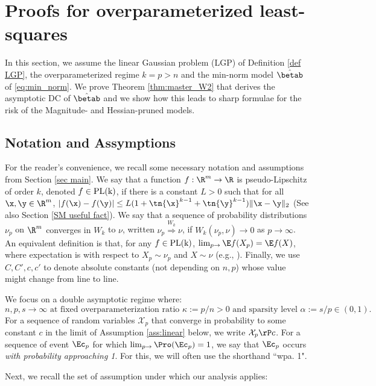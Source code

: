 
\section{Proofs for overparameterized least-squares}\label{sec proof thm 1}
In this section, we assume the linear Gaussian problem (LGP) of Definition \ref{def LGP}, the overparameterized regime $k=p>n$ and the min-norm model $\hat\betab$ of \eqref{eq:min_norm}. We prove Theorem \ref{thm:master_W2} that derives the asymptotic DC of $\hat\betab$ and we show how this leads to sharp formulae for the risk of the Magnitude- and Hessian-pruned models.


\subsection{Notation and Assymptions}
For the reader's convenience, we recall some necessary notation and assumptions from Section \ref{sec main}.  We say that a function $f:\R^m\rightarrow\R$ is pseudo-Lipschitz of order $k$, denoted $f\in\rm{PL}(k)$, if there is a constant $L>0$ such that for all $\x,\y\in\R^m$,
$
|f(\x) - f(\y)|\leq L(1+\tn{\x}^{k-1}+\tn{\y}^{k-1})\|\x-\y\|_2 
$
(See also Section \ref{SM useful fact}). 
We say that a sequence of probability distributions $\nu_p$ on $\R^m$ {converges in $W_k$} to 
$\nu$, written $\nu_p\stackrel{W_k}{\Longrightarrow} \nu$, if $W_k(\nu_p,\nu) \rightarrow 0$ as $p \rightarrow \infty$. An equivalent definition is that, for any $f\in\rm{PL}(k)$, $\lim_{p\rightarrow}\E f(X_p)=\E f(X)$, where expectation is with respect to $X_p\sim\nu_p$ and $X\sim\nu$ (e.g., \cite{montanari2017estimation}).
%
Finally, we use $C,C',c,c'$ to denote absolute constants (not depending on $n,p$) whose value might change from line to line. 


We focus on a double asymptotic regime where:
$$n,p,s\rightarrow\infty \text{ at fixed overparameterization ratio } \kappa:=p/n>0 \text{ and sparsity level } \alpha:=s/p\in(0,1).$$  
%
For a sequence of random variables $\mathcal{X}_{p}$ that converge in probability to some constant $c$ in the limit of Assumption \ref{ass:linear} below, we  write $\mathcal{X}_{p}\rP c$. For a sequence of event $\Ec_p$ for which $\lim_{p\rightarrow}\Pro(\Ec_p) = 1$, we say that $\Ec_p$ occurs \emph{with probability approaching 1}. For this, we will often use the shorthand ``wpa. 1".


Next, we recall the set of assumption under which our analysis applies:



